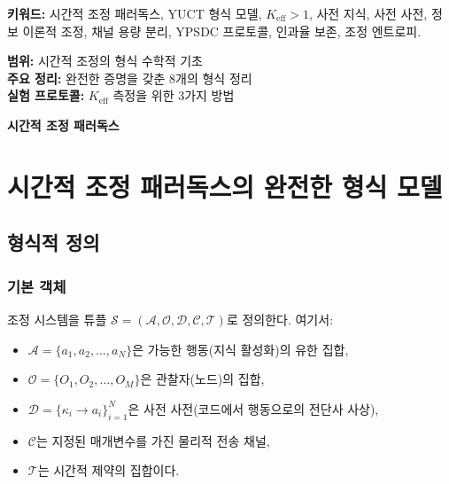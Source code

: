 \documentclass[12pt,a4paper]{article}
\begin{document}
\begin{titlepage}
\begin{center}
			\vspace{0.5cm}
			\normalsize
			\textbf{키워드:} 시간적 조정 패러독스, YUCT 형식 모델, $K_{\text{eff}} > 1$, 사전 지식, 사전 사전, 정보 이론적 조정, 채널 용량 분리, YPSDC 프로토콜, 인과율 보존, 조정 엔트로피.
			
			\vspace{0cm}
			\normalsize
			
			\textbf{범위:} 시간적 조정의 형식 수학적 기초 \\
			\textbf{주요 정리:} 완전한 증명을 갖춘 8개의 형식 정리 \\
			\textbf{실험 프로토콜:} $K_{\text{eff}}$ 측정을 위한 3가지 방법 \\
			
			\vspace{0.5cm}
			\normalsize
			
		\end{center}
	\end{titlepage}
	
	\begin{center}
		\vspace*{0.5cm}
		\Huge\textbf{시간적 조정 패러독스}
		\vspace{1cm}
	\end{center}
	
	\section{시간적 조정 패러독스의 완전한 형식 모델}
	\label{app:formal-model}
	
	\subsection{형식적 정의}
	\label{app:definitions}
	
	\subsubsection{기본 객체}
	
	조정 시스템을 튜플 $\mathcal{S} = (\mathcal{A}, \mathcal{O}, \mathcal{D}, \mathcal{C}, \mathcal{T})$로 정의한다. 여기서:
	
	\begin{itemize}
		\item $\mathcal{A} = \{a_1, a_2, \dots, a_N\}$은 가능한 행동(지식 활성화)의 유한 집합,
		\item $\mathcal{O} = \{O_1, O_2, \dots, O_M\}$은 관찰자(노드)의 집합,
		\item $\mathcal{D} = \{\kappa_i \to a_i\}_{i=1}^N$은 사전 사전(코드에서 행동으로의 전단사 사상),
		\item $\mathcal{C}$는 지정된 매개변수를 가진 물리적 전송 채널,
		\item $\mathcal{T}$는 시간적 제약의 집합이다.
	\end{itemize}
	
\end{document}

